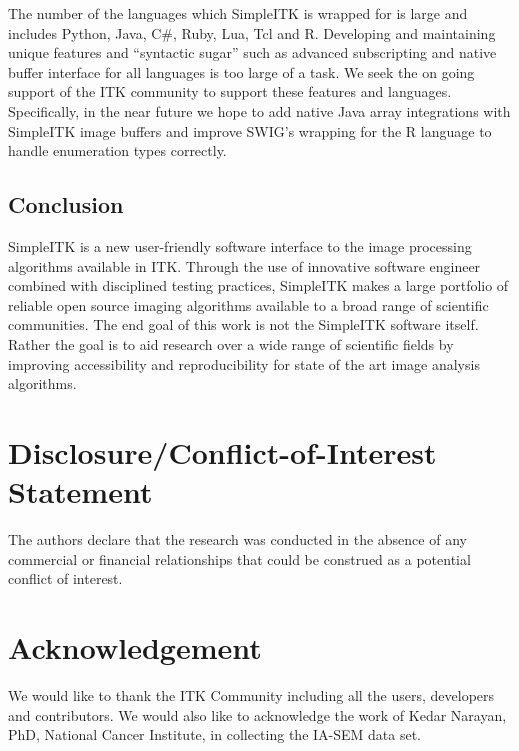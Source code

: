 \documentclass{frontiersMED} %
\begin{document}
The number of the languages which SimpleITK is wrapped for is large
and includes Python, Java, C\#, Ruby, Lua, Tcl and R. Developing and
maintaining unique features and ``syntactic sugar'' such as advanced
subscripting and native buffer interface for all languages is too
large of a task. We seek the on going support of the ITK community to
support these features and languages. Specifically, in the near future
we hope to add native Java array integrations with SimpleITK image
buffers and improve SWIG's wrapping for the R language to handle
enumeration types correctly.

\subsection{Conclusion}
SimpleITK is a new user-friendly software interface to the image
processing algorithms available in ITK. Through the use of innovative
software engineer combined with disciplined testing practices,
SimpleITK makes a large portfolio of reliable open source imaging
algorithms available to a broad range of scientific communities. The
end goal of this work is not the SimpleITK software itself. Rather the
goal is to aid research over a wide range of scientific fields by
improving accessibility and reproducibility for state of the art image
analysis algorithms.

\section*{Disclosure/Conflict-of-Interest Statement}
The authors declare that the research was conducted in the absence of any commercial or financial relationships that could be construed as a potential conflict of interest.

\section*{Acknowledgement}

We would like to thank the ITK Community including all the users,
developers and contributors. We would also like to acknowledge the
work of Kedar Narayan, PhD, National Cancer Institute,  in collecting
the IA-SEM data set.
\end{document}
